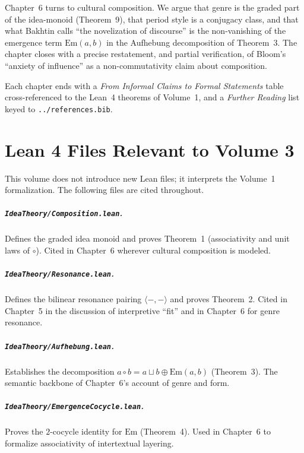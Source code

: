 \documentclass[11pt,oneside]{book}
\begin{document}
Chapter~6 turns to cultural composition. We argue that genre is the
graded part of the idea-monoid (Theorem~9), that period style is a
conjugacy class, and that what Bakhtin calls ``the novelization of
discourse'' is the non-vanishing of the emergence term
$\mathrm{Em}(a,b)$ in the Aufhebung decomposition of Theorem~3. The
chapter closes with a precise restatement, and partial verification,
of Bloom's ``anxiety of influence'' as a non-commutativity claim
about composition.

Each chapter ends with a \emph{From Informal Claims to Formal
Statements} table cross-referenced to the Lean~4 theorems of
Volume~1, and a \emph{Further Reading} list keyed to
\texttt{../references.bib}.




\appendix
\chapter{Lean 4 Files Relevant to Volume 3}
This volume does not introduce new Lean files; it interprets the
Volume~1 formalization. The following files are cited throughout.

\paragraph{\texttt{IdeaTheory/Composition.lean}.}
Defines the graded idea monoid and proves Theorem~1 (associativity
and unit laws of $\circ$). Cited in Chapter~6 wherever cultural
composition is modeled.

\paragraph{\texttt{IdeaTheory/Resonance.lean}.}
Defines the bilinear resonance pairing $\langle-,-\rangle$ and proves
Theorem~2. Cited in Chapter~5 in the discussion of interpretive
``fit'' and in Chapter~6 for genre resonance.

\paragraph{\texttt{IdeaTheory/Aufhebung.lean}.}
Establishes the decomposition $a\circ b = a\sqcup b\oplus
\mathrm{Em}(a,b)$ (Theorem~3). The semantic backbone of Chapter~6's
account of genre and form.

\paragraph{\texttt{IdeaTheory/EmergenceCocycle.lean}.}
Proves the $2$-cocycle identity for $\mathrm{Em}$ (Theorem~4). Used
in Chapter~6 to formalize associativity of intertextual layering.
\end{document}
